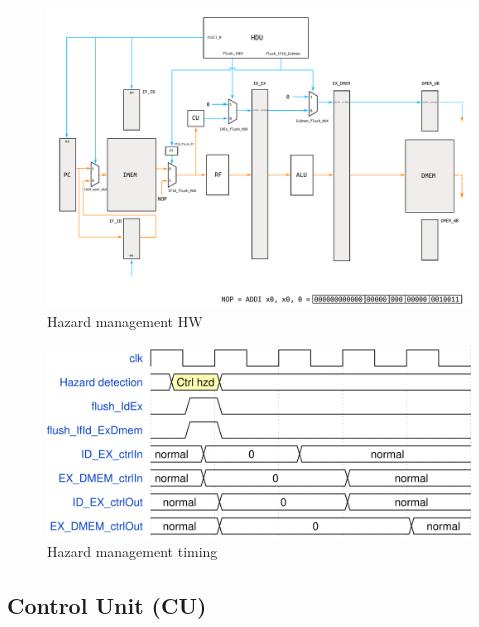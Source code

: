 \documentclass[a4paper]{article}
\begin{document}
\begin{figure}[hbtp]
    \centering
    \includegraphics[scale=0.5]{../hzd_management/ref/schematic/hzd_management.pdf}
    \caption{Hazard management HW}
    \label{fig:hzd_management}
\end{figure}

\begin{figure}[hbtp]
    \centering
    \includegraphics[scale=0.8]{../hzd_management/ref/timing/hzd_management_timing.png}
    \caption{Hazard management timing}
    \label{fig:hzd_management_timing}
\end{figure}

\subsection{Control Unit (CU)}
\end{document}
